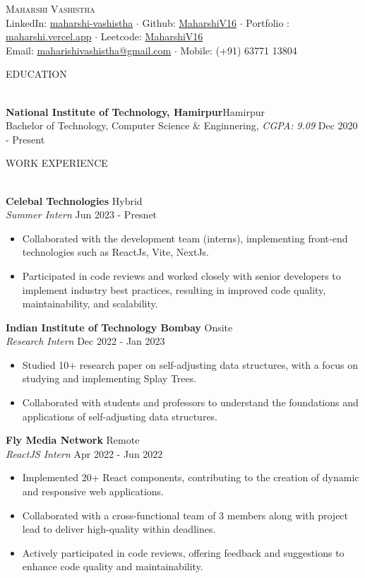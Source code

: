 \documentclass[a4paper]{article}
\newcommand{\bulletSep} { \vspace{2mm} }
\newcommand{\sectionSep} { \vspace{4mm} }
\newcommand{\lineunder} {
    \vspace*{-8pt} \\
    \hspace*{-15pt} \hrulefill \\
}
\newcommand{\header} [1] {
    {\hspace*{-18pt}\vspace*{6pt} {
        \large \scshape #1
    }}
    \vspace*{-6pt} \lineunder
    \vspace{1mm}
}
\newcommand{\educationItem}[5]{
    \textbf{#1}\hfill #2\\
    #3, \textit{#4} \hfill #5\\
}
\newcommand{\experienceItem}[5]{
    \textbf{#1} \hfill #2 \\
    \textit{#3} \hfill #4 \\
    \begin{itemize}
        #5
    \end{itemize}
}
\begin{document}

\begin{center}
    {\Huge \scshape {}\selectfont Maharshi Vashistha}\\
    \bulletSep
    LinkedIn: \href{https://www.linkedin.com/in/maharshi-vashistha/}{maharshi-vashistha} $\cdot$
    Github: \href{https://github.com/MaharshiV16}{MaharshiV16} $\cdot$
    Portfolio : \href{https://maharshi.vercel.app/}{maharshi.vercel.app} $\cdot$
    Leetcode: \href{https://leetcode.com/MaharshiV16/}{MaharshiV16} \\
    \bulletSep
    Email: \href {mailto:maharishivashistha@gmail.com}{maharishivashistha@gmail.com} $\cdot$ Mobile: (+91) 63771 13804\\
    \sectionSep
\end{center}

\vspace{-3mm}


\header{EDUCATION}

\educationItem{National Institute of Technology, Hamirpur}{Hamirpur}{Bachelor of Technology, Computer Science \& Enginnering}{CGPA: 9.09}{Dec 2020 - Present}

\sectionSep


\header{WORK EXPERIENCE}

\experienceItem{Celebal Technologies}{Hybrid}{Summer Intern}{Jun 2023 - Presnet}{
     \item Collaborated with the development team (interns), implementing front-end technologies such as ReactJs, Vite, NextJs.
     \item Participated in code reviews and worked closely with senior developers to implement industry best practices, resulting in improved code quality, maintainability, and scalability.
}
\bulletSep

\experienceItem{Indian Institute of Technology Bombay}{Onsite}{Research Intern}{Dec 2022 - Jan 2023}{
     \item Studied 10+ research paper on self-adjusting data structures, with a focus on studying and implementing Splay Trees.
     \item Collaborated with students and professors to understand the foundations and applications of self-adjusting data structures.
}
\bulletSep

\experienceItem{Fly Media Network}{Remote}{ReactJS Intern}{Apr 2022 - Jun 2022}{
     \item Implemented 20+ React components, contributing to the creation of dynamic and responsive web applications.
     \item Collaborated with a cross-functional team of 3 members along with project lead to deliver high-quality within deadlines.
    \item Actively participated in code reviews, offering feedback and suggestions to enhance code quality and maintainability.
}
\bulletSep
\end{document}
